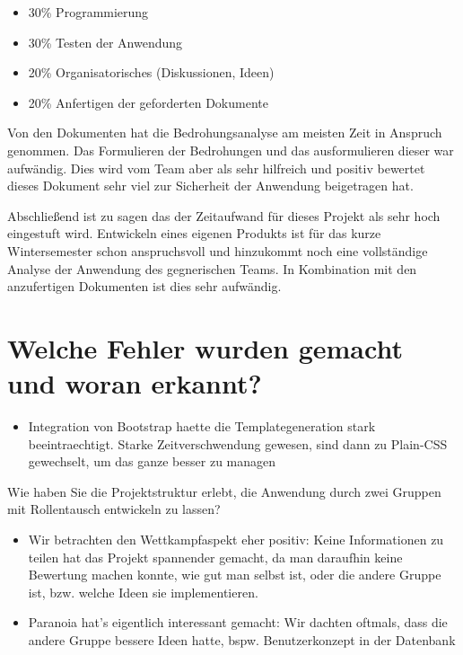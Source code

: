 \documentclass[12pt,DIV14,BCOR10mm,a4paper,parskip=half-,headsepline,headinclude,english,ngerman,bibliography=totocnumbered]{scrreprt}
\begin{document}
\begin{itemize}
  \item 30\% Programmierung
  \item 30\% Testen der Anwendung
  \item 20\% Organisatorisches (Diskussionen, Ideen)
  \item 20\% Anfertigen der geforderten Dokumente
\end{itemize}

Von den Dokumenten hat die Bedrohungsanalyse am meisten Zeit in Anspruch genommen. Das Formulieren der Bedrohungen und das ausformulieren dieser war aufwändig. Dies wird vom Team aber als sehr hilfreich und positiv bewertet dieses Dokument sehr viel zur Sicherheit der Anwendung beigetragen hat.

Abschließend ist zu sagen das der Zeitaufwand für dieses Projekt als sehr hoch eingestuft wird. Entwickeln eines eigenen Produkts ist für das kurze Wintersemester schon anspruchsvoll und hinzukommt noch eine vollständige Analyse der Anwendung des gegnerischen Teams. In Kombination mit den anzufertigen Dokumenten ist dies sehr aufwändig.

\section{Welche Fehler wurden gemacht und woran erkannt?}

\begin{itemize}
  \item Integration von Bootstrap haette die Templategeneration stark beeintraechtigt. Starke Zeitverschwendung gewesen, sind dann zu Plain-CSS gewechselt, um das ganze besser zu managen
\end{itemize}

Wie haben Sie die Projektstruktur erlebt, die Anwendung durch zwei Gruppen mit Rollentausch entwickeln zu lassen?

\begin{itemize}
  \item Wir betrachten den Wettkampfaspekt eher positiv: Keine Informationen zu teilen hat das Projekt spannender gemacht, da man daraufhin keine Bewertung machen konnte, wie gut man selbst ist, oder die andere Gruppe ist, bzw. welche Ideen sie implementieren.
  \item Paranoia hat's eigentlich interessant gemacht: Wir dachten oftmals, dass die andere Gruppe bessere Ideen hatte, bspw. Benutzerkonzept in der Datenbank
\end{itemize}
\end{document}
